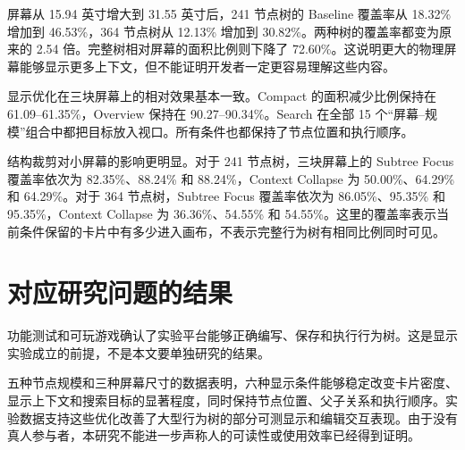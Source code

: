 屏幕从 15.94 英寸增大到 31.55 英寸后，241 节点树的 Baseline 覆盖率从 18.32\% 增加到 46.53\%，364 节点树从 12.13\% 增加到 30.82\%。两种树的覆盖率都变为原来的 2.54 倍。完整树相对屏幕的面积比例则下降了 72.60\%。这说明更大的物理屏幕能够显示更多上下文，但不能证明开发者一定更容易理解这些内容。

显示优化在三块屏幕上的相对效果基本一致。Compact 的面积减少比例保持在 61.09--61.35\%，Overview 保持在 90.27--90.34\%。Search 在全部 15 个“屏幕--规模”组合中都把目标放入视口。所有条件也都保持了节点位置和执行顺序。

结构裁剪对小屏幕的影响更明显。对于 241 节点树，三块屏幕上的 Subtree Focus 覆盖率依次为 82.35\%、88.24\% 和 88.24\%，Context Collapse 为 50.00\%、64.29\% 和 64.29\%。对于 364 节点树，Subtree Focus 覆盖率依次为 86.05\%、95.35\% 和 95.35\%，Context Collapse 为 36.36\%、54.55\% 和 54.55\%。这里的覆盖率表示当前条件保留的卡片中有多少进入画布，不表示完整行为树有相同比例同时可见。

\section{对应研究问题的结果}

功能测试和可玩游戏确认了实验平台能够正确编写、保存和执行行为树。这是显示实验成立的前提，不是本文要单独研究的结果。

五种节点规模和三种屏幕尺寸的数据表明，六种显示条件能够稳定改变卡片密度、显示上下文和搜索目标的显著程度，同时保持节点位置、父子关系和执行顺序。实验数据支持这些优化改善了大型行为树的部分可测显示和编辑交互表现。由于没有真人参与者，本研究不能进一步声称人的可读性或使用效率已经得到证明。
